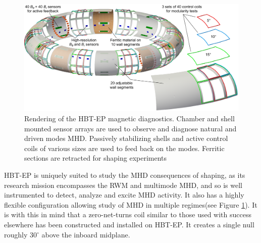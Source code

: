 \documentclass[aps,prl,twocolumn,superscriptaddress,groupedaddress]{revtex4}  %
\begin{document}
	\begin{figure}[htb]
	\centering
	\includegraphics[scale=.25]{../Plots/Plasma_with_sensors_FWall_concept_WithCCview.png}
	\caption{Rendering of the HBT-EP magnetic diagnostics.  Chamber and shell mounted sensor arrays are used to observe and diagnose natural and driven modes MHD.  Passively stabilizing shells and active control coils of various sizes are used to feed back on the modes.  Ferritic sections are retracted for shaping experiments}
	\label{schematic}
	\end{figure}
HBT-EP is uniquely suited to study the MHD consequences of shaping, as its research mission encompasses the RWM and multimode MHD, and so is well instrumented to detect, analyze and excite MHD activity.  It also has a highly flexible configuration allowing study of MHD in multiple regimes(see Figure \ref{schematic}). It is with this in mind that a zero-net-turns coil similar to those used with success elsewhere\cite{Keilhacker} has been constructed and installed on HBT-EP.  It creates a single null roughly 30${^\circ}$ above the inboard midplane.

	

\end{document}
